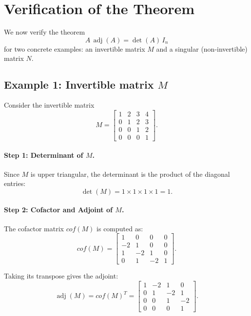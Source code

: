 \documentclass{article}
\begin{document}
\section{Verification of the Theorem}

We now verify the theorem
\[
A\,\operatorname{adj}(A) = \det(A)\,I_n
\]
for two concrete examples: an invertible matrix $M$ and a singular (non-invertible) matrix $N$.

\subsection*{Example 1: Invertible matrix $M$}

Consider the invertible matrix
\[
M =
\begin{bmatrix}
1 & 2 & 3 & 4 \\
0 & 1 & 2 & 3 \\
0 & 0 & 1 & 2 \\
0 & 0 & 0 & 1
\end{bmatrix}.
\]

\paragraph{Step 1: Determinant of $M$.}
Since $M$ is upper triangular, the determinant is the product of the diagonal entries:
\[
\det(M) = 1 \times 1 \times 1 \times 1 = 1.
\]

\paragraph{Step 2: Cofactor and Adjoint of $M$.}
The cofactor matrix $cof(M)$ is computed as:
\[
cof(M) =
\begin{bmatrix}
1 & 0 & 0 & 0\\
-2 & 1 & 0 & 0\\
1 & -2 & 1 & 0\\
0 & 1 & -2 & 1
\end{bmatrix}.
\]

Taking its transpose gives the adjoint:
\[
\operatorname{adj}(M) = cof(M)^T =
\begin{bmatrix}
1 & -2 & 1 & 0\\
0 & 1 & -2 & 1\\
0 & 0 & 1 & -2\\
0 & 0 & 0 & 1
\end{bmatrix}.
\]
\end{document}
